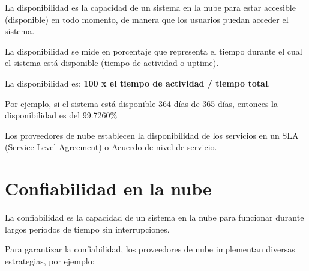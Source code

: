 \documentclass[11pt,a4paper,oneside]{book}
\begin{document}
La disponibilidad es la capacidad de un sistema en la nube para estar accesible (disponible) en todo momento, de manera que los usuarios puedan acceder el sistema.

La disponibilidad se mide en porcentaje que representa el tiempo durante el cual el sistema está disponible (tiempo de actividad o uptime).

La disponibilidad es: \textbf{100 x el tiempo de actividad / tiempo total}.

Por ejemplo, si el sistema está disponible 364 días de 365 días, entonces la disponibilidad es del 99.7260\%

Los proveedores de nube establecen la disponibilidad de los servicios en un SLA (Service Level Agreement) o Acuerdo de nivel de servicio.

\section{Confiabilidad en la nube}

La confiabilidad es la capacidad de un sistema en la nube para funcionar durante largos períodos de tiempo sin interrupciones.

Para garantizar la confiabilidad, los proveedores de nube implementan diversas estrategias, por ejemplo:
\end{document}
